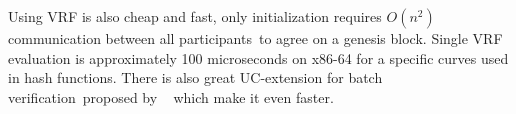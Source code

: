 Using VRF is also cheap and fast, only initialization requires ${O(n^2)}$ communication between all participants\
to agree on a genesis block.
Single VRF evaluation is approximately 100 microseconds on x86-64 for a specific curves used in hash functions.
There is also great UC-extension for batch verification\
proposed by ~\cite{cryptoeprint:2022/1045} which make it even faster.